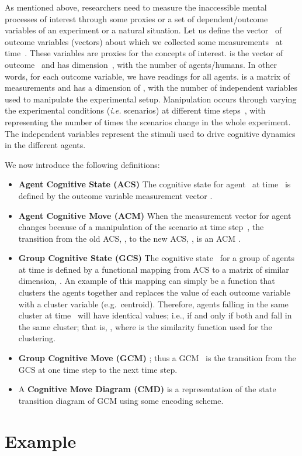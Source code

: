 \documentclass[conference]{IEEEtran}
\begin{document}
As mentioned above, researchers need to measure the inaccessible mental processes of interest
through some proxies or a set of dependent/outcome variables of an experiment or a natural
situation. Let us define the vector~ of outcome
variables (vectors) about which we collected some measurements~ at time~. These
variables are proxies for the concepts of interest.  is the vector of
outcome~ and has dimension~, with  the number of agents/humans. In other words, for each
outcome variable, we have readings for all  agents.  is a matrix of measurements and
has a dimension of , with  the number of independent variables used to manipulate
the experimental setup. Manipulation occurs through varying the experimental conditions ({\it i.e.}
scenarios) at different time steps~, with  representing the number of times the
scenarios change in the whole experiment. The independent variables represent the stimuli used to
drive cognitive dynamics in the  different agents.

We now introduce the following definitions:
\begin{itemize}
\item {\bf Agent Cognitive State (ACS)} The cognitive state  for agent~ at time~
is defined by the outcome variable measurement vector .
\item {\bf Agent Cognitive Move (ACM)} When the measurement vector for agent~ changes because of
a manipulation of the scenario at time step~, the transition from the old ACS, , to
the new ACS, , is an ACM .
\item {\bf Group Cognitive State (GCS)} The cognitive state~ for a group of agents
 at time  is defined by a functional mapping from ACS to a matrix of similar
dimension, . An example of this mapping can simply
be a function that clusters the agents together and replaces the value of each outcome variable
with a cluster variable (e.g.\ centroid). Therefore, agents falling in the same cluster at time~
will have identical values; i.e.,  if and only if both  and  fall in
the same cluster; that is, , where  is the similarity function used for
the clustering.
\item {\bf Group Cognitive Move (GCM)}  ;
thus a GCM~ is the transition from the GCS at one time step to the next time
step.
\item A {\bf Cognitive Move Diagram (CMD)} is a representation of the state transition diagram of
GCM using some encoding scheme.
\end{itemize}

\section{Example}
\end{document}
